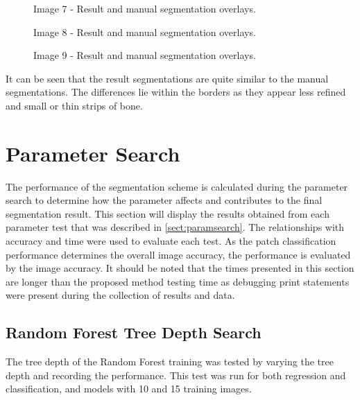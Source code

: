  \begin{figure}[H]
    \centering
    \quad
    \caption{Image 7 - Result and manual segmentation overlays.}%
    \label{fig:overlay7}
\end{figure}

\begin{figure}[H]
    \centering
    \quad
    \caption{Image 8 - Result and manual segmentation overlays.}%
    \label{fig:overlay8}
\end{figure}

\begin{figure}[H]
    \centering
    \quad
    \caption{Image 9 - Result and manual segmentation overlays.}%
    \label{fig:overlay9}
\end{figure}
 
 It can be seen that the result segmentations are quite similar to the manual segmentations. The differences lie within the borders as they appear less refined and small or thin strips of bone. 

\section{Parameter Search}
\label{sect:parametersearch}
The performance of the segmentation scheme is calculated during the parameter search to determine how the parameter affects and contributes to the final segmentation result. This section will display the results obtained from each parameter test that was described in \ref{sect:paramsearch}. The relationships with accuracy and time were used to evaluate each test. As the patch classification performance determines the overall image accuracy, the performance is evaluated by the image accuracy. It should be noted that the times presented in this section are longer than the proposed method testing time as debugging print statements were present during the collection of results and data. 
\subsection{Random Forest Tree Depth Search}
The tree depth of the Random Forest training was tested by varying the tree depth and recording the performance. This test was run for both regression and classification, and models with 10 and 15 training images. 

